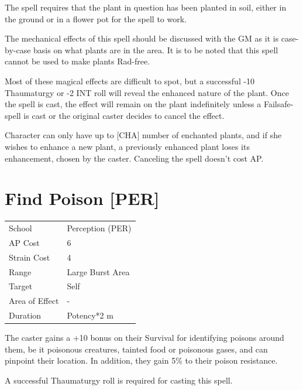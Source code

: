 \documentclass[11pt,a4paper,twocolumn]{book}
\begin{document}
The spell requires that the plant in question has been planted in soil, either in the ground or in a flower pot for the spell to work.

The mechanical effects of this spell should be discussed with the GM as it is case-by-case basis on what plants are in the area. It is to be noted that this spell cannot be used to make plants Rad-free.

Most of these magical effects are difficult to spot, but a successful -10 Thaumaturgy or -2 INT roll will reveal the enhanced nature of the plant.
Once the spell is cast, the effect will remain on the plant indefinitely unless a Failsafe-spell is cast or the original caster decides to cancel the effect.

Character can only have up to [CHA] number of enchanted plants, and if she wishes to enhance a new plant, a previously enhanced plant loses its enhancement, chosen by the caster. Canceling the spell doesn't cost AP.

\vfill

\section*{Find Poison [PER]}
{
	\begin{tabu} to 75mm{| X[l,4] | X[l,7] |}
		\hline
		School 			& Perception (PER) 	\\
        AP Cost	      	& 6 				\\
        Strain Cost     & 4 				\\
        Range     		& Large Burst Area 	\\
        Target      	& Self 				\\
        Area of Effect  & - 	 			\\
        Duration     	& Potency*2 m 		\\ \hline
	\end{tabu}
		
}

\medskip

The caster gains a +10 bonus on their Survival for identifying poisons around them, be it poisonous creatures, tainted food or poisonous gases, and can pinpoint their location. In addition, they gain 5\% to their poison resistance.

A successful Thaumaturgy roll is required for casting this spell.
\end{document}
